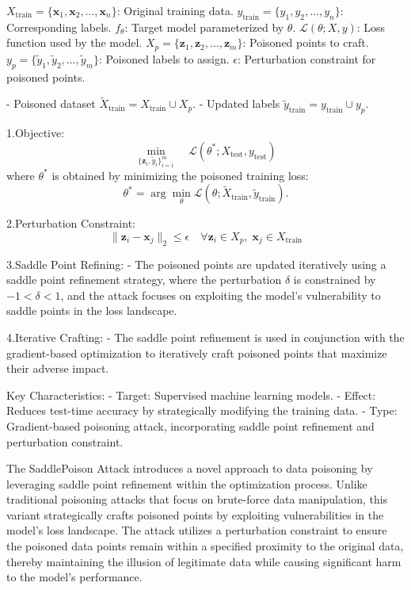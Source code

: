 $X_{\text{train}} = \{\mathbf{x}_1, \mathbf{x}_2, \ldots, \mathbf{x}_n\}$: Original training data.
$y_{\text{train}} = \{y_1, y_2, \ldots, y_n\}$: Corresponding labels.
$f_\theta$: Target model parameterized by $\theta$.
$\mathcal{L}(\theta; X, y)$: Loss function used by the model.
$X_p = \{\mathbf{z}_1, \mathbf{z}_2, \ldots, \mathbf{z}_m\}$: Poisoned points to craft.
$y_p = \{\tilde{y}_1, \tilde{y}_2, \ldots, \tilde{y}_m\}$: Poisoned labels to assign.
$\epsilon$: Perturbation constraint for poisoned points.

- Poisoned dataset $\tilde{X}_{\text{train}} = X_{\text{train}} \cup X_p$.
- Updated labels $\tilde{y}_{\text{train}} = y_{\text{train}} \cup y_p$.

1.Objective:
   \[
   \min_{\{\mathbf{z}_i, \tilde{y}_i\}_{i=1}^m} \quad \mathcal{L}(\theta^*; X_{\text{test}}, y_{\text{test}})
   \]
   where $\theta^*$ is obtained by minimizing the poisoned training loss:
   \[
   \theta^* = \arg \min_\theta \mathcal{L}(\theta; \tilde{X}_{\text{train}}, \tilde{y}_{\text{train}}).
   \]

2.Perturbation Constraint:
   \[
   \|\mathbf{z}_i - \mathbf{x}_j\|_2 \leq \epsilon \quad \forall \mathbf{z}_i \in X_p, \; \mathbf{x}_j \in X_{\text{train}}
   \]

3.Saddle Point Refining:
   - The poisoned points are updated iteratively using a saddle point refinement strategy, where the perturbation $\delta$ is constrained by $-1 < \delta < 1$, and the attack focuses on exploiting the model's vulnerability to saddle points in the loss landscape.

4.Iterative Crafting:
   - The saddle point refinement is used in conjunction with the gradient-based optimization to iteratively craft poisoned points that maximize their adverse impact.

Key Characteristics:
- Target: Supervised machine learning models.
- Effect: Reduces test-time accuracy by strategically modifying the training data.
- Type: Gradient-based poisoning attack, incorporating saddle point refinement and perturbation constraint.

The SaddlePoison Attack introduces a novel approach to data poisoning by leveraging saddle point refinement within the optimization process. Unlike traditional poisoning attacks that focus on brute-force data manipulation, this variant strategically crafts poisoned points by exploiting vulnerabilities in the model's loss landscape. The attack utilizes a perturbation constraint to ensure the poisoned data points remain within a specified proximity to the original data, thereby maintaining the illusion of legitimate data while causing significant harm to the model's performance.